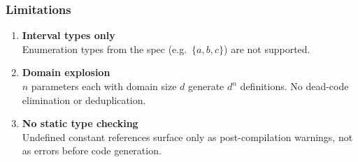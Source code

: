 \documentclass[t]{beamer}
\begin{document}

\begin{frame}
  \frametitle{Limitations}

  \begin{enumerate}

    \item \textbf{Interval types only} \\
          Enumeration types from the spec (e.g.\ $\{a, b, c\}$) are not supported.

    \vspace{0.2cm}

    \item \textbf{Domain explosion} \\
          $n$ parameters each with domain size $d$ generate $d^n$ definitions.
          No dead-code elimination or deduplication.

    \vspace{0.2cm}

    \item \textbf{No static type checking} \\
          Undefined constant references surface only as post-compilation
          warnings, not as errors before code generation.

  \end{enumerate}

\end{frame}
\end{document}
